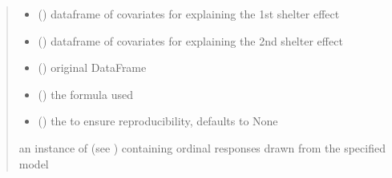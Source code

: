 \documentclass[letterpaper,10pt,english]{sphinxmanual}
\begin{document}
\begin{fulllineitems}
\begin{quote}
\begin{description}
\begin{itemize}
\item {} 
\sphinxAtStartPar
{} () \textendash{} dataframe of covariates for explaining the 1st shelter effect

\item {} 
\sphinxAtStartPar
{} () \textendash{} dataframe of covariates for explaining the 2nd shelter effect

\item {} 
\sphinxAtStartPar
{} () \textendash{} original DataFrame

\item {} 
\sphinxAtStartPar
{} () \textendash{} the formula used

\item {} 
\sphinxAtStartPar
{} (\sphinxstyleliteralemphasis{\sphinxupquote{, }}) \textendash{} the  to ensure reproducibility, defaults to None

\end{itemize}

\sphinxAtStartPar
an instance of  (see ) containing ordinal responses drawn from the specified model

\end{description}\end{quote}

\end{fulllineitems}

\end{document}

